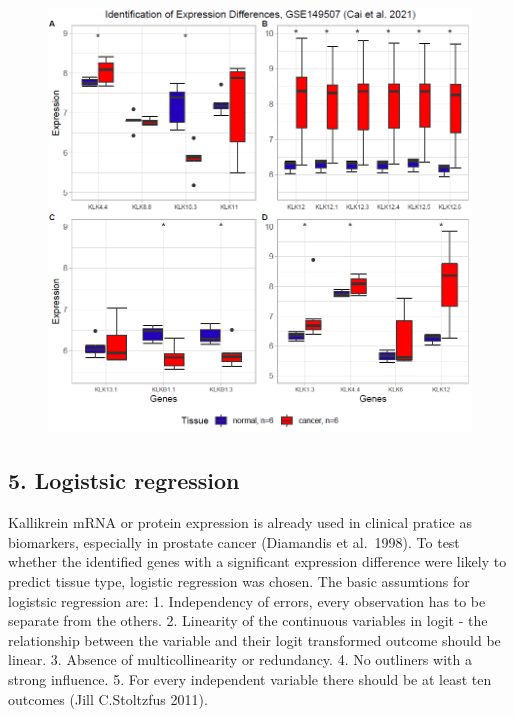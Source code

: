 \documentclass[
]{article}
\begin{document}
\begin{figure}

{\centering \includegraphics[width=0.5\linewidth]{images/Expr_diff_kmeans_PCA_lung} 

}

\end{figure}

\hypertarget{logistsic-regression}{%
\subsection{5. Logistsic regression}\label{logistsic-regression}}

Kallikrein mRNA or protein expression is already used in clinical
pratice as biomarkers, especially in prostate cancer (Diamandis et
al.~1998). To test whether the identified genes with a significant
expression difference were likely to predict tissue type, logistic
regression was chosen. The basic assumtions for logistsic regression
are: 1. Independency of errors, every observation has to be separate
from the others. 2. Linearity of the continuous variables in logit - the
relationship between the variable and their logit transformed outcome
should be linear. 3. Absence of multicollinearity or redundancy. 4. No
outliners with a strong influence. 5. For every independent variable
there should be at least ten outcomes (Jill C.Stoltzfus 2011).
\end{document}
